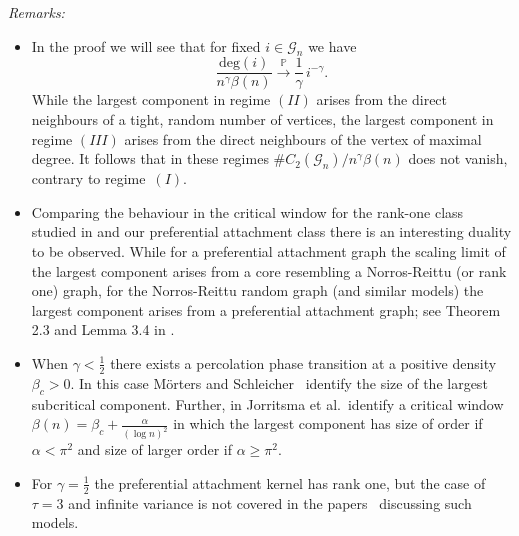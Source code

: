 \documentclass[12pt,a4paper]{article}
\numberwithin{equation}{section}
\begin{document}
\noindent\emph{Remarks:}
\begin{itemize}[leftmargin=7mm]
    \item[(i)] In the proof we will see that for fixed $i\in\mathscr G_n$ we have $$\frac{\text{deg}(i)}{n^\gamma\beta(n) } \overset{\mathbb P}{\longrightarrow}\frac1\gamma \, i^{-\gamma}.$$ While the largest component in regime $(I\!I)$ arises from 
    the direct neighbours of a {tight}, random number of vertices, the largest 
    component in regime $(I\!I\!I)$ arises from the direct neighbours of the vertex of 
    maximal degree. It follows that in these regimes  $\#C_2(\mathscr G_n)/ n^\gamma \beta(n)$ does not vanish, contrary to regime~$(I)$.
    \item[(ii)] Comparing the behaviour in the critical window for the rank-one class
    studied in \cite{BDH} and our preferential attachment class there is an interesting duality to be observed. While for a preferential attachment graph the scaling limit of the  largest component arises from a core resembling a Norros-Reittu (or rank one) graph, for the Norros-Reittu random graph (and similar models) the largest component arises from a preferential attachment graph; see Theorem 2.3 and Lemma 3.4 in \cite{BDH}.
    \item[(iii)] When $\gamma <\tfrac12$ there exists a percolation phase transition at a positive density $\beta_c>0$. In this case M\"orters and Schleicher~\cite{nick}  identify the size of the largest subcritical component. Further,
    in \cite{JMM} Jorritsma et al.\ identify a critical window 
    $\beta(n)=\beta_c+ \frac{\alpha}{(\log n)^2}$
    in which the largest component has size of order  if  $\alpha<\pi^2$ and size of larger order if $\alpha\ge \pi^2$.
    \item[(iv)] For $\gamma=\frac12$ the preferential attachment kernel has rank one, but the case of $\tau=3$ and infinite variance is not covered in the papers~\cite{BDH, vdH} discussing such models.
\end{itemize}
\end{document}

